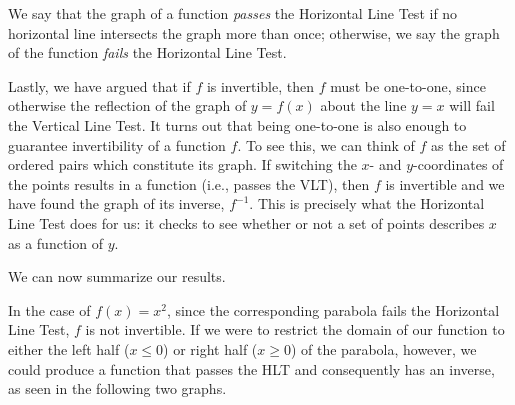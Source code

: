 \documentclass[12pt]{book}
\theoremstyle{definition}
\begin{document}
We say that the graph of a function {\it passes} the Horizontal Line Test  if no horizontal line intersects the graph more than once; otherwise, we say the graph of the function {\it fails} the Horizontal Line Test.\par
Lastly, we have argued that if $f$ is invertible, then $f$ must be one-to-one, since otherwise the reflection of the graph of $y = f(x)$ about the line $y = x$ will fail the Vertical Line Test.  It turns out that being one-to-one is also enough to guarantee invertibility of a function $f$.  To see this, we can think of $f$ as the set of ordered pairs which constitute its graph.  If switching the $x$- and $y$-coordinates of the points results in a function (i.e., passes the VLT), then $f$ is invertible and we have found the graph of its inverse, $f^{-1}$. This is precisely what the Horizontal Line Test does for us: it checks to see whether or not a set of points describes $x$ as a function of $y$.\par
We can now summarize our results.
\begin{center}
\end{center}
In the case of $f(x)=x^2$, since the corresponding parabola fails the Horizontal Line Test, $f$ is not invertible.  If we were to restrict the domain of our function to either the left half ($x\leq 0$) or right half ($x\geq 0$) of the parabola, however, we could produce a function that passes the HLT and consequently has an inverse, as seen in the following two graphs. 
\end{document}
